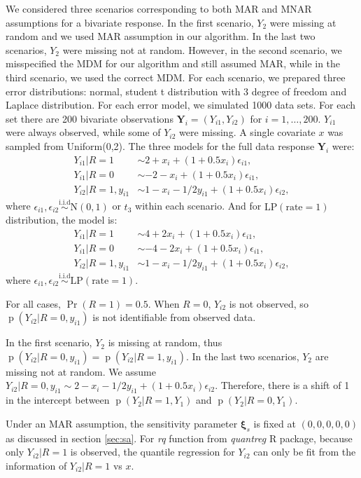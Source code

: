 \documentclass[12pt]{article}
\newcommand{\iid}{\stackrel{\text{i.i.d}}{\sim}}
\DeclareMathOperator{\pr}{p}
\DeclareMathOperator{\prob}{Pr}
\begin{document}
We considered three scenarios corresponding to both MAR and MNAR
assumptions for a bivariate response.  In the first scenario, $Y_2$
were missing at random and we used MAR assumption in our algorithm. In
the last two scenarios, $Y_2$ were missing not at random. However, in
the second scenario, we misspecified the MDM for our algorithm and
still assumed MAR, while in the third scenario, we used the correct
MDM.  For each scenario, we prepared three error distributions:
normal, student t distribution with 3 degree of freedom and Laplace
distribution. For each error model, we simulated 1000 data sets. For
each set there are 200 bivariate observations $\bm Y_i = (Y_{i1},
Y_{i2})$ for $i = 1, \ldots, 200$. $Y_{i1}$ were always observed,
while some of $Y_{i2}$ were missing. A single covariate $x$ was
sampled from Uniform(0,2). The three models for the full data response
$\bm Y_i$ were:
\begin{align*}
  Y_{i1} | R = 1 & \sim 2 + x_i + (1 + 0.5x_i) \epsilon_{i1} , \\
  Y_{i1}| R = 0 & \sim  -2 - x_i + (1 + 0.5x_i) \epsilon_{i1} , \\
  Y_{i2}| R = 1, y_{i1}&\sim 1 - x_i - 1/2y_{i1} + (1 + 0.5x_i)
  \epsilon_{i2},
\end{align*}
where $\epsilon_{i1}, \epsilon_{i2} \iid \textrm{N}(0, 1)$ or $t_3$
within each scenario. And for $\text{LP}(\text{rate} = 1)$
distribution, the model is:
\begin{align*}
  Y_{i1} | R = 1 & \sim 4 + 2x_i + (1 + 0.5x_i) \epsilon_{i1} , \\
  Y_{i1}| R = 0 & \sim  -4 - 2x_i + (1 + 0.5x_i) \epsilon_{i1} , \\
  Y_{i2}| R = 1, y_{i1}&\sim 1 - x_i - 1/2y_{i1} + (1 + 0.5x_i)
  \epsilon_{i2},
\end{align*}
where $\epsilon_{i1}, \epsilon_{i2} \iid \text{LP}(\text{rate} = 1)$.

For all cases, $\prob (R = 1) = 0.5$.  When $R = 0$, $Y_{i2}$ is not
observed, so $\pr(Y_{i2}| R = 0, y_{i1})$ is not identifiable from
observed data.

In the first scenario, $Y_2$ is missing at random, thus $\pr(Y_{i2} |
R = 0, y_{i1}) = \pr(Y_{i2}|R = 1, y_{i1}) $. In the last two
scenarios, $Y_2$ are missing not at random. We assume $Y_{i2}| R = 0,
y_{i1} \sim 2 - x_i - 1/2y_{i1} + (1 + 0.5x_i)
\epsilon_{i2}$. Therefore, there is a shift of 1 in the intercept
between $\pr(Y_2|R = 1, Y_1)$ and $\pr(Y_2|R = 0, Y_1)$.

Under an MAR assumption, the sensitivity parameter $\bm \xi_s$ is
fixed at $(0,0,0,0,0)$ as discussed in section \ref{sec:sa}. For
\textit{rq} function from \textit{quantreg} R package, because only
$Y_{i2}|R = 1$ is observed, the quantile regression for $Y_{i2}$ can
only be fit from the information of $Y_{i2}|R = 1$ vs $x$.
\end{document}
